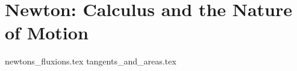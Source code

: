 \section{Newton: Calculus and the Nature of Motion}

{newtons_fluxions.tex}
{tangents_and_areas.tex}
